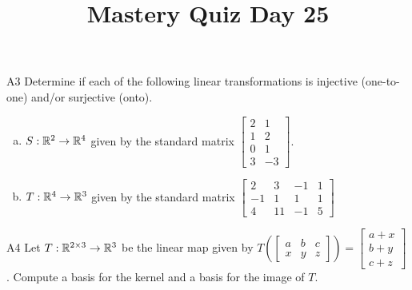 \documentclass{sbgLAquiz}
\title{Mastery Quiz Day 25 }
\begin{document}
\begin{problem}{A3}
Determine if each of the following linear transformations is injective (one-to-one) and/or surjective (onto).
\begin{enumerate}[(a)]
\item $S: \mathbb{R}^2 \rightarrow \mathbb{R}^4$ given by the standard matrix $\begin{bmatrix} 2 & 1 \\ 1 & 2 \\ 0 & 1 \\ 3 & -3 \end{bmatrix}$.
\item $T: \mathbb{R}^4 \rightarrow \mathbb{R}^3$ given by the standard matrix $\begin{bmatrix} 2 & 3 & -1 & 1 \\ -1 & 1 & 1 & 1 \\ 4 & 11 & -1 & 5 \end{bmatrix}$
\end{enumerate}
\end{problem}

\begin{problem}{A4}
Let $T: \mathbb{R}^{2\times 3} \rightarrow \mathbb{R}^3$ be the linear map given by \(
  T\left(\begin{bmatrix} a & b & c \\ x & y & z \end{bmatrix} \right) =
  \begin{bmatrix}
    a+x \\ b+y \\ c+z
  \end{bmatrix}
\). Compute a basis for the kernel and a basis for the image of $T$.
\end{problem}
\end{document}
